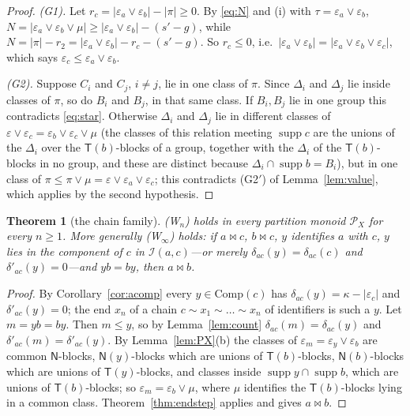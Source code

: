 \documentclass[11pt]{amsart}
\newtheorem{theorem}{Theorem}[section]
\theoremstyle{definition}
\renewcommand{\P}{\mathcal{P}}
\newcommand{\supp}{\operatorname{supp}}
\newcommand{\T}{\mathsf{T}}
\newcommand{\N}{\mathsf{N}}
\newcommand{\mt}{\bowtie}   %
\begin{document}
\begin{proof}
\emph{(G1).} Let $r_c=|\varepsilon_a\vee\varepsilon_b|-|\pi|\ge0$. By \eqref{eq:N} and (i) with $\tau=\varepsilon_a\vee\varepsilon_b$, $N=|\varepsilon_a\vee\varepsilon_b\vee\mu|\ge|\varepsilon_a\vee\varepsilon_b|-(s'-g)$, while $N=|\pi|-r_2=|\varepsilon_a\vee\varepsilon_b|-r_c-(s'-g)$. So $r_c\le0$, i.e.\ $|\varepsilon_a\vee\varepsilon_b|=|\varepsilon_a\vee\varepsilon_b\vee\varepsilon_c|$, which says $\varepsilon_c\le\varepsilon_a\vee\varepsilon_b$.

\emph{(G2).} Suppose $C_i$ and $C_j$, $i\ne j$, lie in one class of $\pi$. Since $\Delta_i$ and $\Delta_j$ lie inside classes of $\pi$, so do $B_i$ and $B_j$, in that same class. If $B_i,B_j$ lie in one group this contradicts \eqref{eq:star}. Otherwise $\Delta_i$ and $\Delta_j$ lie in different classes of $\varepsilon\vee\varepsilon_c=\varepsilon_b\vee\varepsilon_c\vee\mu$ (the classes of this relation meeting $\supp c$ are the unions of the $\Delta_i$ over the $\T(b)$-blocks of a group, together with the $\Delta_i$ of the $\T(b)$-blocks in no group, and these are distinct because $\Delta_i\cap\supp b=B_i$), but in one class of $\pi\le\pi\vee\mu=\varepsilon\vee\varepsilon_a\vee\varepsilon_c$; this contradicts (G2$'$) of Lemma~\ref{lem:value}, which applies by the second hypothesis.
\end{proof}

\begin{theorem}[the chain family]\label{thm:Wn}
\textup{(W$_n$)} holds in every partition monoid $\P_X$ for every $n\ge1$. More generally \textup{(W$_\infty$)} holds: if $a\mt c$, $b\mt c$, $y$ identifies $a$ with $c$, $y$ lies in the component of $c$ in $\mathcal I(a,c)$---or merely $\delta_{ac}(y)=\delta_{ac}(c)$ and $\delta'_{ac}(y)=0$---and $yb=by$, then $a\mt b$.
\end{theorem}

\begin{proof}
By Corollary~\ref{cor:acomp} every $y\in\mathrm{Comp}(c)$ has $\delta_{ac}(y)=\kappa-|\varepsilon_c|$ and $\delta'_{ac}(y)=0$; the end $x_n$ of a chain $c\sim x_1\sim\dots\sim x_n$ of identifiers is such a $y$. Let $m=yb=by$. Then $m\le y$, so by Lemma~\ref{lem:count} $\delta_{ac}(m)=\delta_{ac}(y)$ and $\delta'_{ac}(m)=\delta'_{ac}(y)$. By Lemma~\ref{lem:PX}(b) the classes of $\varepsilon_m=\varepsilon_y\vee\varepsilon_b$ are common $\N$-blocks, $\N(y)$-blocks which are unions of $\T(b)$-blocks, $\N(b)$-blocks which are unions of $\T(y)$-blocks, and classes inside $\supp y\cap\supp b$, which are unions of $\T(b)$-blocks; so $\varepsilon_m=\varepsilon_b\vee\mu$, where $\mu$ identifies the $\T(b)$-blocks lying in a common class. Theorem~\ref{thm:endstep} applies and gives $a\mt b$.
\end{proof}
\end{document}
